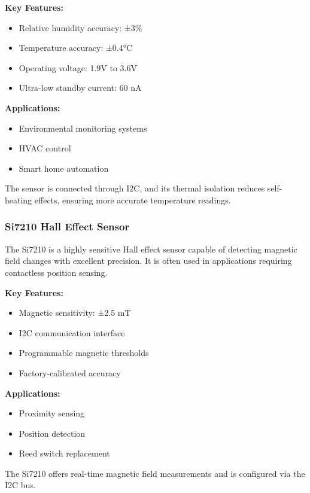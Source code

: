 \documentclass[
  9pt,
  letterpaper,
  abstract,
  titlepage]{scrbook}
\begin{document}
\textbf{Key Features:}

\begin{itemize}
\item
  Relative humidity accuracy: ±3\%
\item
  Temperature accuracy: ±0.4°C
\item
  Operating voltage: 1.9V to 3.6V
\item
  Ultra-low standby current: 60 nA
\end{itemize}

\textbf{Applications:}

\begin{itemize}
\item
  Environmental monitoring systems
\item
  HVAC control
\item
  Smart home automation
\end{itemize}

The sensor is connected through I2C, and its thermal isolation reduces
self-heating effects, ensuring more accurate temperature readings.

\subsubsection{Si7210 Hall Effect
Sensor}\label{si7210-hall-effect-sensor}

The Si7210 is a highly sensitive Hall effect sensor capable of detecting
magnetic field changes with excellent precision. It is often used in
applications requiring contactless position sensing.

\textbf{Key Features:}

\begin{itemize}
\item
  Magnetic sensitivity: ±2.5 mT
\item
  I2C communication interface
\item
  Programmable magnetic thresholds
\item
  Factory-calibrated accuracy
\end{itemize}

\textbf{Applications:}

\begin{itemize}
\item
  Proximity sensing
\item
  Position detection
\item
  Reed switch replacement
\end{itemize}

The Si7210 offers real-time magnetic field measurements and is
configured via the I2C bus.
\end{document}
